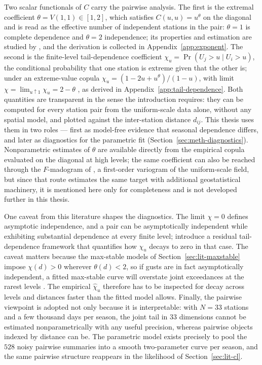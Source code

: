 Two scalar functionals of \(C\) carry the pairwise analysis. The first is the extremal coefficient \(\theta=V(1,1)\in[1,2]\), which satisfies \(C(u,u)=u^{\theta}\) on the diagonal and is read as the effective number of independent stations in the pair: \(\theta=1\) is complete dependence and \(\theta=2\) independence; its properties and estimation are studied by \citet{schlather2003}, and the derivation is collected in Appendix~\ref{app:exponent}. The second is the finite-level tail-dependence coefficient \(\chi_u=\Pr(U_j>u\mid U_i>u)\), the conditional probability that one station is extreme given that the other is; under an extreme-value copula \(\chi_u=(1-2u+u^{\theta})/(1-u)\), with limit \(\chi=\lim_{u\uparrow1}\chi_u=2-\theta\) \citep{coles1999}, as derived in Appendix~\ref{app:tail-dependence}. Both quantities are transparent in the sense the introduction requires: they can be computed for every station pair from the uniform-scale data alone, without any spatial model, and plotted against the inter-station distance \(d_{ij}\). This thesis uses them in two roles --- first as model-free evidence that seasonal dependence differs, and later as diagnostics for the parametric fit (Section~\ref{sec:meth-diagnostics}). Nonparametric estimates of \(\theta\) are available directly from the empirical copula evaluated on the diagonal at high levels; the same coefficient can also be reached through the \(F\)-madogram of \citet{cooley2006}, a first-order variogram of the uniform-scale field, but since that route estimates the same target with additional geostatistical machinery, it is mentioned here only for completeness and is not developed further in this thesis.

One caveat from this literature shapes the diagnostics. The limit \(\chi=0\) defines asymptotic independence, and a pair can be asymptotically independent while exhibiting substantial dependence at every finite level; \citet{ledford1996} introduce a residual tail-dependence framework that quantifies how \(\chi_u\) decays to zero in that case. The caveat matters because the max-stable models of Section~\ref{sec:lit-maxstable} impose \(\chi(d)>0\) wherever \(\theta(d)<2\), so if gusts are in fact asymptotically independent, a fitted max-stable curve will overstate joint exceedances at the rarest levels \citep{davison2013,huserwadsworth2022}. The empirical \(\widehat\chi_u\) therefore has to be inspected for decay across levels and distances faster than the fitted model allows. Finally, the pairwise viewpoint is adopted not only because it is interpretable: with \(N=33\) stations and a few thousand days per season, the joint tail in \(33\) dimensions cannot be estimated nonparametrically with any useful precision, whereas pairwise objects indexed by distance can be. The parametric model exists precisely to pool the \(528\) noisy pairwise summaries into a smooth two-parameter curve per season, and the same pairwise structure reappears in the likelihood of Section~\ref{sec:lit-cl}.

